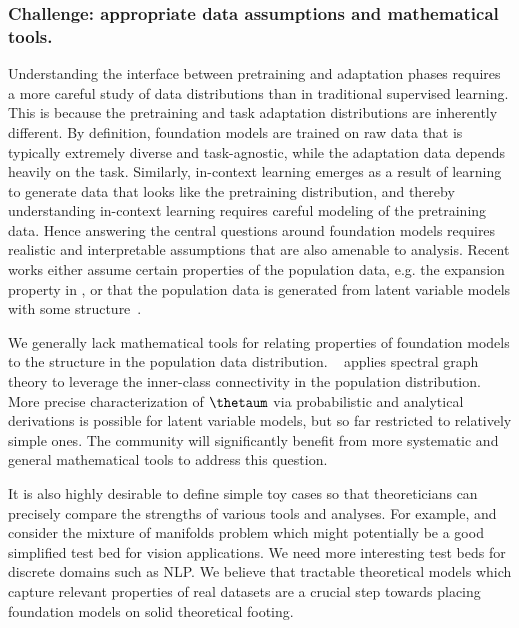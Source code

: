 \subsubsection{Challenge: appropriate data assumptions and mathematical tools.}
 \label{sec:theory-tools}
Understanding the interface between pretraining and adaptation phases requires a more careful study of data distributions than in traditional supervised learning. This is because the pretraining and task adaptation distributions are inherently different. By definition, foundation models are trained on raw data that is typically extremely diverse and task-agnostic, while the adaptation data depends  heavily on the task. Similarly, in-context learning emerges as a result of learning to generate data that looks like the pretraining distribution, and thereby understanding in-context learning requires careful modeling of the pretraining data. Hence answering the central questions around foundation models requires realistic and interpretable assumptions that are also amenable to analysis. Recent works either assume certain properties of the population data, e.g. the expansion property in \citet{haochen2021spectral, wei2020theoretical}, or that the population data is generated from latent variable models with some structure~\citep{SaMa20mat,wei2021pretrained,arora2015latent,lee2020predicting,zhang20ont,tosh2021contrastive}.

We generally lack mathematical tools for relating properties of foundation models to the structure in the population data distribution.  ~\citet{haochen2021spectral} applies spectral graph theory to leverage the inner-class connectivity in the population distribution. More precise characterization of $\thetaum$ via probabilistic and analytical derivations is possible for latent variable models, but so far restricted to relatively simple ones. The community will significantly benefit from more systematic and general mathematical tools to address this question. 

It is also highly desirable to define simple toy cases so that theoreticians can precisely compare the strengths of various tools and analyses. For example, \citet{haochen2021spectral} and \citet{wei2020theoretical} consider the mixture of manifolds problem which might potentially be a good simplified test bed for vision applications. We need more interesting test beds for discrete domains such as NLP. We believe that tractable theoretical models which capture relevant properties of real datasets are a crucial step towards placing foundation models on solid theoretical footing.

